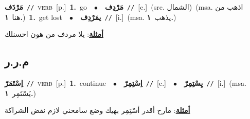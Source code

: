 \documentclass[10pt,a4paper,twoside]{article} %
\begin{document}
\begin{multicols}{2}
{\setlength\topsep{0pt}\textbf{\foreignlanguage{arabic}{مَرْدَف}}\ {\color{gray}\texttt{//}\color{black}}\ \textsc{verb}\ [p.]\ \textbf{1.}~go\ \ $\bullet$\ \ \setlength\topsep{0pt}\textbf{\foreignlanguage{arabic}{مَرْدِف}}\ {\color{gray}\texttt{//}\color{black}}\ [c.]\ (src. \color{gray}\foreignlanguage{arabic}{الشمال}\color{black})\ \color{gray}(msa. \foreignlanguage{arabic}{اذهب من هنا}~\foreignlanguage{arabic}{\textbf{١.}})\color{black}\ \textbf{1.}~get lost\ \ $\bullet$\ \ \setlength\topsep{0pt}\textbf{\foreignlanguage{arabic}{يمَرْدِف}}\ {\color{gray}\texttt{//}\color{black}}\ [i.]\ \color{gray}(msa. \foreignlanguage{arabic}{يذهب}~\foreignlanguage{arabic}{\textbf{١.}})\color{black}\  \begin{flushright}\color{gray}\foreignlanguage{arabic}{\textbf{\underline{\foreignlanguage{arabic}{أمثلة}}}: يلا مردف من هون احسنلك}\end{flushright}\color{black}} \vspace{2mm}

\vspace{-3mm}
\subsection*{\color{blue}\foreignlanguage{arabic}{م.ر.ر}\color{blue}{}} 

{\setlength\topsep{0pt}\textbf{\foreignlanguage{arabic}{اِسْتَمَرّ}}\ {\color{gray}\texttt{//}\color{black}}\ \textsc{verb}\ [p.]\ \textbf{1.}~continue\ \ $\bullet$\ \ \setlength\topsep{0pt}\textbf{\foreignlanguage{arabic}{اِسْتِمِرّ}}\ {\color{gray}\texttt{//}\color{black}}\ [c.]\ \ $\bullet$\ \ \setlength\topsep{0pt}\textbf{\foreignlanguage{arabic}{يِسْتِمِرّ}}\ {\color{gray}\texttt{//}\color{black}}\ [i.]\ \color{gray}(msa. \foreignlanguage{arabic}{يَسْتَمِر}~\foreignlanguage{arabic}{\textbf{١.}})\color{black}\  \begin{flushright}\color{gray}\foreignlanguage{arabic}{\textbf{\underline{\foreignlanguage{arabic}{أمثلة}}}: مارح أقدر أسْتِمِر بهيك وضع سامحني لازم نفض الشراكة}\end{flushright}\color{black}} \vspace{2mm}


\end{multicols}
\end{document}
